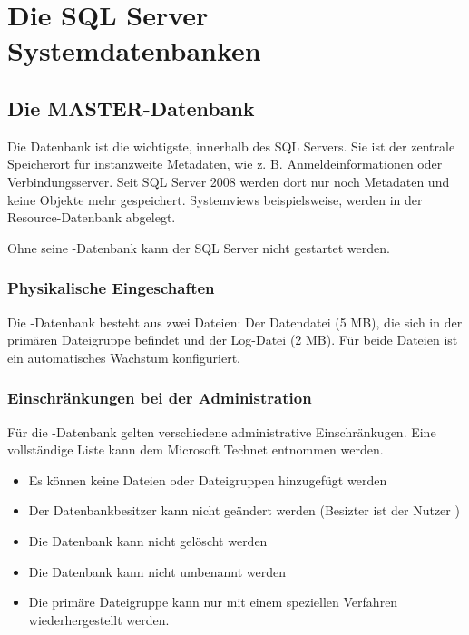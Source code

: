     \section{Die SQL Server Systemdatenbanken}
      \subsection{Die MASTER-Datenbank}
        Die Datenbank  ist die wichtigste, innerhalb des SQL
        Servers. Sie ist der zentrale Speicherort für instanzweite Metadaten,
        wie z. B. Anmeldeinformationen oder Verbindungsserver. Seit SQL Server
        2008 werden dort nur noch Metadaten und keine Objekte mehr gespeichert.
        Systemviews beispielsweise, werden in der Resource-Datenbank
         abgelegt.
        \begin{merke}
          Ohne seine -Datenbank kann der SQL Server nicht
          gestartet werden.
        \end{merke}
        \subsubsection{Physikalische Eingeschaften}
          Die -Datenbank besteht aus zwei Dateien: Der
          Datendatei  (5 MB), die sich in der primären
          Dateigruppe befindet und der Log-Datei  (2 MB).
          Für beide Dateien ist ein automatisches Wachstum konfiguriert.
        \subsubsection{Einschränkungen bei der Administration}
          Für die -Datenbank gelten verschiedene
          administrative Einschränkugen. Eine vollständige Liste kann dem
          Microsoft Technet entnommen werden.
          \begin{itemize}
            \item Es können keine Dateien oder Dateigruppen hinzugefügt werden
            \item Der Datenbankbesitzer kann nicht geändert werden (Besizter
            ist der Nutzer )
            \item Die Datenbank kann nicht gelöscht werden
            \item Die Datenbank kann nicht umbenannt werden
            \item Die primäre Dateigruppe kann nur mit einem
            speziellen Verfahren wiederhergestellt werden.
          \end{itemize}
